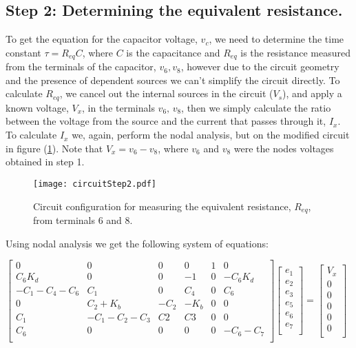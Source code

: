 \subsection{Step 2: Determining the equivalent resistance.}
To get the equation for the capacitor voltage, $v_c$, we need to determine the time constant $\tau = R_{eq}C$, where $C$ is the capacitance and $R_{eq}$ is the resistance measured from the terminals of the capacitor, $v_6, v_8$, however due to the circuit geometry and the presence of dependent sources we can't simplify the circuit directly. To calculate $R_{eq}$, we cancel out the internal sources in the circuit ($V_s$), and apply a known voltage, $V_x$, in the terminals $v_6,\, v_8$, then we simply calculate the ratio between  the voltage from the source and the current that passes through it, $I_x$. To calculate $I_x$ we, again, perform the nodal analysis, but on the modified circuit in figure (\ref{fig: step 2}). Note that $V_x = v_6-v_8$, where $v_6$ and $v_8$ were the nodes voltages obtained in step 1. 

\begin{figure}[H] \centering
  \texttt{[image: circuitStep2.pdf]}
  \caption{Circuit configuration for measuring the equivalent resistance, $R_{eq}$, from terminals $6$ and $8$.}
  \label{fig: step 2}
\end{figure}

Using nodal analysis we get the following system of equations:
    	
$\begin{bmatrix}
0  &  0 &  0 &  0 & 1 & 0\\
C_6 K_d & 0 & 0 & -1 & 0 & -C_6 K_d\\
-C_1-C_4-C_6 & C_1 & 0 & C_4 & 0 & C_6\\
0 & C_2+ K_b & -C_2 & -K_b & 0 & 0\\
C_1 & -C_1-C_2-C_3 & C2 & C3 & 0 & 0\\
C_6 & 0 & 0 & 0 & 0 & -C_6-C_7\\
\end{bmatrix}
\begin{bmatrix}
e_1\\
e_2\\
e_3\\
e_5\\
e_6\\
e_7\\
\end{bmatrix}
=
\begin{bmatrix}
V_x\\
0\\
0\\
0\\
0\\
0\\
\end{bmatrix}$

